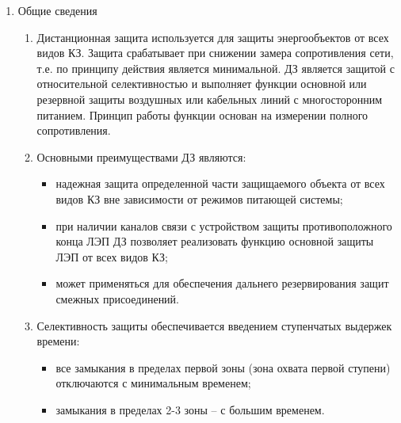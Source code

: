 
\color{black}

\begin{enumerate}
\item Общие сведения

\begin{enumerate}

\item
Дистанционная защита используется для защиты энергообъектов от всех видов КЗ. Защита срабатывает при снижении замера  сопротивления  сети,  т.е.  по  принципу  действия  является  минимальной.  ДЗ  является  защитой с относительной  селективностью  и  выполняет  функции  основной  или  резервной  защиты  воздушных  или кабельных  линий  с  многосторонним  питанием. Принцип работы функции основан на измерении полного сопротивления.

\item 
Основными преимуществами ДЗ являются:
\begin{itemize}
    \item надежная защита определенной части защищаемого объекта от всех видов КЗ вне зависимости от режимов питающей системы; 
    \item при наличии каналов связи с устройством защиты противоположного конца ЛЭП ДЗ позволяет реализовать функцию основной защиты ЛЭП от всех видов КЗ; 
    \item может  применяться  для  обеспечения  дальнего  резервирования  защит  смежных присоединений.
\end{itemize}

\item 
Селективность защиты обеспечивается введением ступенчатых выдержек времени:
\begin{itemize} 
\item все замыкания в пределах первой зоны (зона  охвата  первой  ступени) отключаются с минимальным временем; 
\item замыкания в пределах 2-3 зоны -- с большим временем.
\end{itemize}


\end{enumerate}
\end{enumerate}
